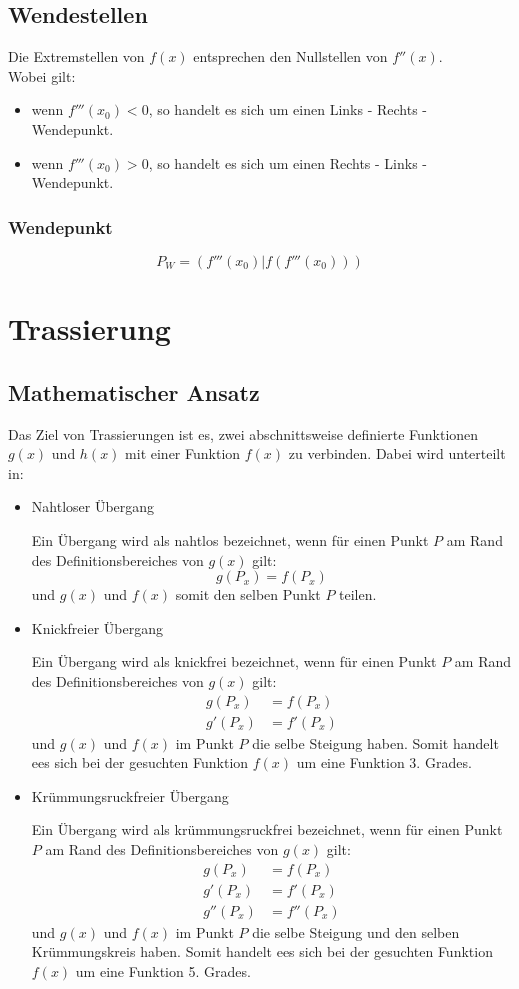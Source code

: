 \documentclass[a4paper,12pt]{article}
\begin{document}
\subsection{Wendestellen}
Die Extremstellen von $f(x)$ entsprechen den Nullstellen von $f''(x)$.\\
Wobei gilt:
\begin{itemize}
\item wenn $f'''(x_0) < 0$, so handelt es sich um einen Links - Rechts - Wendepunkt.
\item wenn $f'''(x_0) > 0$, so handelt es sich um einen Rechts - Links - Wendepunkt.
\end{itemize}
\subsubsection{Wendepunkt}
$$P_{W} = (f'''(x_0) | f(f'''(x_0)))$$
\pagebreak
\section{Trassierung}
\subsection{Mathematischer Ansatz}
Das Ziel von Trassierungen ist es, zwei abschnittsweise definierte Funktionen $g(x)$ und $h(x)$ mit einer Funktion $f(x)$ zu verbinden.
Dabei wird unterteilt in:
\begin{itemize}
\item Nahtloser Übergang
	\subitem \parbox[t]{\linewidth}
	{
		Ein Übergang wird als nahtlos bezeichnet, wenn für einen Punkt $P$ am Rand des Definitionsbereiches von $g(x)$ gilt:
		$$g(P_x) = f(P_x)$$
		und $g(x)$ und $f(x)$ somit den selben Punkt $P$ teilen.
	}
\item Knickfreier Übergang
	\subitem \parbox[t]{\linewidth}
	{
		Ein Übergang wird als knickfrei bezeichnet, wenn für einen Punkt $P$ am Rand des Definitionsbereiches von $g(x)$ gilt:
		\begin{equation*}
		\begin{split}
		g(P_x) & = f(P_x)\\
		g'(P_x) &  = f'(P_x)
		\end{split}
		\end{equation*}
		und $g(x)$ und $f(x)$ im Punkt $P$ die selbe Steigung haben. Somit handelt ees sich bei der gesuchten Funktion $f(x)$ um eine Funktion 3. Grades.
	}
\item Krümmungsruckfreier Übergang
	\subitem \parbox[t]{\linewidth}
	{
		Ein Übergang wird als krümmungsruckfrei bezeichnet, wenn für einen Punkt $P$ am Rand des Definitionsbereiches von $g(x)$ gilt:
		\begin{equation*}
		\begin{split}
		g(P_x) & = f(P_x)\\
		g'(P_x) &  = f'(P_x)\\
		g''(P_x) & = f''(P_x)
		\end{split}
		\end{equation*}
		und $g(x)$ und $f(x)$ im Punkt $P$ die selbe Steigung und den selben Krümmungskreis haben. Somit handelt ees sich bei der gesuchten Funktion $f(x)$ um eine Funktion 5. Grades.
	}
\end{itemize}
\pagebreak
\end{document}
